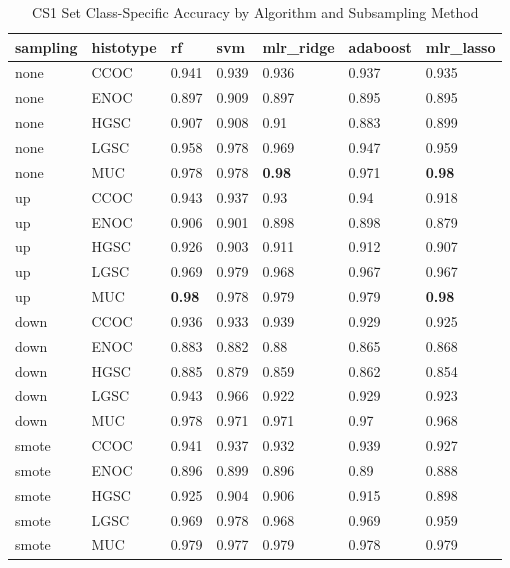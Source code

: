 \documentclass[
]{report}
\begin{document}
\begin{table}

\caption{\label{tab:cs1-accuracy-class-table}CS1 Set Class-Specific Accuracy by Algorithm and Subsampling Method}
\centering
\begin{tabular}[t]{l|l|l|l|l|l|l}
\hline
sampling & histotype & rf & svm & mlr\_ridge & adaboost & mlr\_lasso\\
\hline
none & CCOC & 0.941 & 0.939 & 0.936 & 0.937 & 0.935\\
\hline
none & ENOC & 0.897 & 0.909 & 0.897 & 0.895 & 0.895\\
\hline
none & HGSC & 0.907 & 0.908 & 0.91 & 0.883 & 0.899\\
\hline
none & LGSC & 0.958 & 0.978 & 0.969 & 0.947 & 0.959\\
\hline
none & MUC & 0.978 & 0.978 & \textbf{0.98} & 0.971 & \textbf{0.98}\\
\hline
up & CCOC & 0.943 & 0.937 & 0.93 & 0.94 & 0.918\\
\hline
up & ENOC & 0.906 & 0.901 & 0.898 & 0.898 & 0.879\\
\hline
up & HGSC & 0.926 & 0.903 & 0.911 & 0.912 & 0.907\\
\hline
up & LGSC & 0.969 & 0.979 & 0.968 & 0.967 & 0.967\\
\hline
up & MUC & \textbf{0.98} & 0.978 & 0.979 & 0.979 & \textbf{0.98}\\
\hline
down & CCOC & 0.936 & 0.933 & 0.939 & 0.929 & 0.925\\
\hline
down & ENOC & 0.883 & 0.882 & 0.88 & 0.865 & 0.868\\
\hline
down & HGSC & 0.885 & 0.879 & 0.859 & 0.862 & 0.854\\
\hline
down & LGSC & 0.943 & 0.966 & 0.922 & 0.929 & 0.923\\
\hline
down & MUC & 0.978 & 0.971 & 0.971 & 0.97 & 0.968\\
\hline
smote & CCOC & 0.941 & 0.937 & 0.932 & 0.939 & 0.927\\
\hline
smote & ENOC & 0.896 & 0.899 & 0.896 & 0.89 & 0.888\\
\hline
smote & HGSC & 0.925 & 0.904 & 0.906 & 0.915 & 0.898\\
\hline
smote & LGSC & 0.969 & 0.978 & 0.968 & 0.969 & 0.959\\
\hline
smote & MUC & 0.979 & 0.977 & 0.979 & 0.978 & 0.979\\
\hline
\end{tabular}
\end{table}
\end{document}
